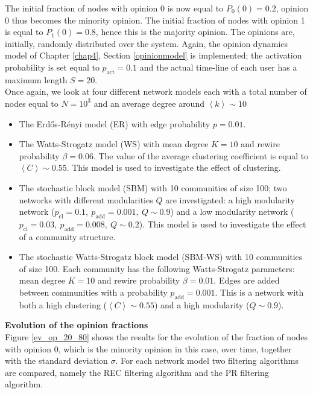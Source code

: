 \documentclass[11 pt , letterpaper , twoside , openright]{book}
\begin{document}
The initial fraction of nodes with opinion 0 is now equal to $P_0(0) = 0.2$, opinion 0 thus becomes the minority opinion. The initial fraction of nodes with opinion 1 is equal to $P_1(0) = 0.8$, hence this is the majority opinion. The opinions are, initially, randomly distributed over the system. Again, the opinion dynamics model of Chapter \ref{chap4}, Section \ref{opinionmodel} is implemented; the activation probability is set equal to $p_{\text{act}} = 0.1$ and the actual time-line of each user has a maximum length $S = 20$.\\
\newline
Once again, we look at four different network models each with a total number of nodes equal to $N = 10^3$ and an average degree around $\left<k\right> \sim 10$
\begin{itemize}
	\item The Erd\H{o}s-R\'{e}nyi model (ER) with edge probability $p = 0.01$.
	\item The Watts-Strogatz model (WS) with mean degree $K=10$ and rewire probability $\beta = 0.06$. The value of the average clustering coefficient is equal to $\left<C\right> \sim 0.55$. This model is used to investigate the effect of clustering.
	\item The stochastic block model (SBM) with 10 communities of size 100; two networks with different modularities $Q$ are investigated: a high modularity network ($p_{\text{cl}} = 0.1,\ p_{\text{add}} = 0.001,\ Q \sim 0.9$) and a low modularity network ($p_{\text{cl}} = 0.03,\ p_{\text{add}} = 0.008,\ Q \sim 0.2$). This model is used to investigate the effect of a community structure.
	\item The stochastic Watts-Strogatz block model (SBM-WS) with 10 communities of size 100. Each community has the following Watts-Strogatz parameters: mean degree $K =10$ and rewire probability $\beta = 0.01$. Edges are added between communities with a probability $p_{\text{add}} = 0.001$. This is a network with both a high clustering ($\left<C\right> \sim 0.55$) and a high modularity ($Q \sim 0.9$).
\end{itemize}
\textbf{Evolution of the opinion fractions}\\
\newline
Figure \ref{ev_op_20_80} shows the results for the evolution of the fraction of nodes with opinion 0, which is the minority opinion in this case, over time, together with the standard deviation $\sigma$. For each network model two filtering algorithms are compared, namely the REC filtering algorithm and the PR filtering algorithm. \\
\end{document}
